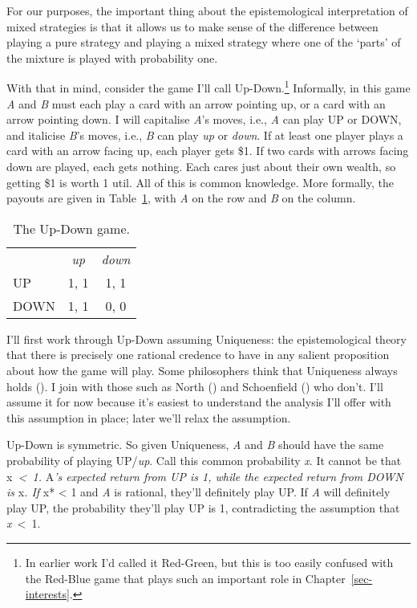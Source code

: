 \documentclass[
  10pt,
  letterpaper,
  twoside]{scrbook}
\begin{document}
For our purposes, the important thing about the epistemological
interpretation of mixed strategies is that it allows us to make sense of
the difference between playing a pure strategy and playing a mixed
strategy where one of the `parts' of the mixture is played with
probability one.

With that in mind, consider the game I'll call Up-Down.\footnote{In
  earlier work I'd called it Red-Green, but this is too easily confused
  with the Red-Blue game that plays such an important role in
  Chapter~\ref{sec-interests}.} Informally, in this game \emph{A} and
\emph{B} must each play a card with an arrow pointing up, or a card with
an arrow pointing down. I will capitalise \emph{A}'s moves, i.e.,
\emph{A} can play UP or DOWN, and italicise \emph{B}'s moves, i.e.,
\emph{B} can play \emph{up} or \emph{down}. If at least one player plays
a card with an arrow facing up, each player gets \$1. If two cards with
arrows facing down are played, each gets nothing. Each cares just about
their own wealth, so getting \$1 is worth 1 util. All of this is common
knowledge. More formally, the payouts are given in
Table~\ref{tbl-up-down}, with \emph{A} on the row and \emph{B} on the
column.

\begin{longtable}[]{@{}lcc@{}}
\caption{The Up-Down game.}\label{tbl-up-down}\tabularnewline
\toprule\noalign{}
\endfirsthead
\endhead
\bottomrule\noalign{}
\endlastfoot
& \emph{up} & \emph{down} \\
UP & 1, 1 & 1, 1 \\
DOWN & 1, 1 & 0, 0 \\
\end{longtable}

I'll first work through Up-Down assuming Uniqueness: the epistemological
theory that there is precisely one rational credence to have in any
salient proposition about how the game will play. Some philosophers
think that Uniqueness always holds
(). I join with those such as
North () and Schoenfield
() who don't. I'll assume it for now
because it's easiest to understand the analysis I'll offer with this
assumption in place; later we'll relax the assumption.

Up-Down is symmetric. So given Uniqueness, \emph{A} and \emph{B} should
have the same probability of playing UP/\emph{up}. Call this common
probability \emph{x}. It cannot be that x\emph{~\textless~1. }A\emph{'s
expected return from UP is 1, while the expected return from DOWN is
}x\emph{. If }x* \textless{} 1 and \emph{A} is rational, they'll
definitely play UP. If \emph{A} will definitely play UP, the probability
they'll play UP is 1, contradicting the assumption that
\emph{x}~\textless~1.
\end{document}
